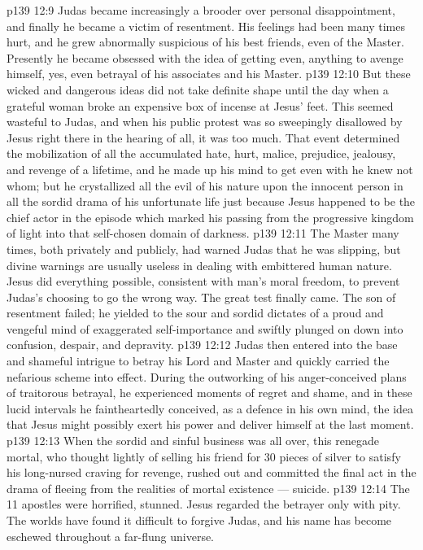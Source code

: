 \vs p139 12:9 \pc Judas became increasingly a brooder over personal disappointment, and finally he became a victim of resentment. His feelings had been many times hurt, and he grew abnormally suspicious of his best friends, even of the Master. Presently he became obsessed with the idea of getting even, anything to avenge himself, yes, even betrayal of his associates and his Master.
\vs p139 12:10 But these wicked and dangerous ideas did not take definite shape until the day when a grateful woman broke an expensive box of incense at Jesus’ feet. This seemed wasteful to Judas, and when his public protest was so sweepingly disallowed by Jesus right there in the hearing of all, it was too much. That event determined the mobilization of all the accumulated hate, hurt, malice, prejudice, jealousy, and revenge of a lifetime, and he made up his mind to get even with he knew not whom; but he crystallized all the evil of his nature upon the  innocent person in all the sordid drama of his unfortunate life just because Jesus happened to be the chief actor in the episode which marked his passing from the progressive kingdom of light into that self\hyp{}chosen domain of darkness.
\vs p139 12:11 The Master many times, both privately and publicly, had warned Judas that he was slipping, but divine warnings are usually useless in dealing with embittered human nature. Jesus did everything possible, consistent with man’s moral freedom, to prevent Judas’s choosing to go the wrong way. The great test finally came. The son of resentment failed; he yielded to the sour and sordid dictates of a proud and vengeful mind of exaggerated self\hyp{}importance and swiftly plunged on down into confusion, despair, and depravity.
\vs p139 12:12 Judas then entered into the base and shameful intrigue to betray his Lord and Master and quickly carried the nefarious scheme into effect. During the outworking of his anger\hyp{}conceived plans of traitorous betrayal, he experienced moments of regret and shame, and in these lucid intervals he faintheartedly conceived, as a defence in his own mind, the idea that Jesus might possibly exert his power and deliver himself at the last moment.
\vs p139 12:13 When the sordid and sinful business was all over, this renegade mortal, who thought lightly of selling his friend for 30 pieces of silver to satisfy his long\hyp{}nursed craving for revenge, rushed out and committed the final act in the drama of fleeing from the realities of mortal existence --- suicide.
\vs p139 12:14 The 11 apostles were horrified, stunned. Jesus regarded the betrayer only with pity. The worlds have found it difficult to forgive Judas, and his name has become eschewed throughout a far\hyp{}flung universe.

